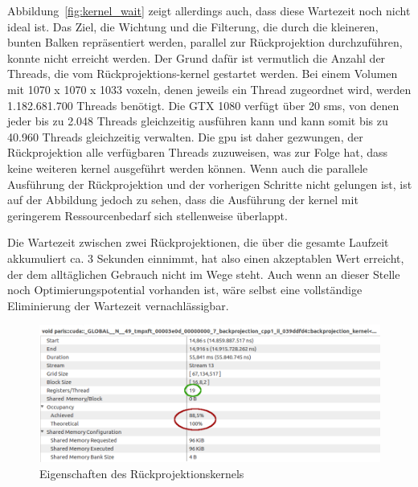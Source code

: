 Abbildung~\ref{fig:kernel_wait} zeigt allerdings auch, dass diese Wartezeit noch nicht ideal ist. Das Ziel, die Wichtung
und die Filterung, die durch die kleineren, bunten Balken repräsentiert werden, parallel zur Rückprojektion
durchzuführen, konnte nicht erreicht werden. Der Grund dafür ist vermutlich die Anzahl der Threads, die vom
Rückprojektions-\gls{kernel} gestartet werden. Bei einem Volumen mit 1070 x 1070 x 1033 \gls{voxel}n, denen jeweils ein
Thread zugeordnet wird, werden 1.182.681.700 Threads benötigt. Die GTX 1080 verfügt über 20 \gls{sm}s, von denen jeder
bis zu 2.048 Threads gleichzeitig ausführen kann und kann somit bis zu 40.960 Threads gleichzeitig verwalten. Die
\gls{gpu} ist daher gezwungen, der Rückprojektion alle verfügbaren Threads zuzuweisen, was zur Folge hat, dass keine
weiteren \gls{kernel} ausgeführt werden können. Wenn auch die parallele Ausführung der Rückprojektion und der vorherigen
Schritte nicht gelungen ist, ist auf der Abbildung jedoch zu sehen, dass die Ausführung der \gls{kernel} mit geringerem
Ressourcenbedarf sich stellenweise überlappt.

Die Wartezeit zwischen zwei Rückprojektionen, die über die gesamte Laufzeit akkumuliert ca. 3 Sekunden einnimmt, hat
also einen akzeptablen Wert erreicht, der dem alltäglichen Gebrauch nicht im Wege steht. Auch wenn an dieser Stelle noch
Optimierungspotential vorhanden ist, wäre selbst eine vollständige Eliminierung der Wartezeit vernachlässigbar.

\begin{figure}
    \includegraphics[width=\linewidth]{img/kernel_properties}
    \caption{Eigenschaften des Rückprojektionskernels}
    \label{fig:kernel_props}
\end{figure}

